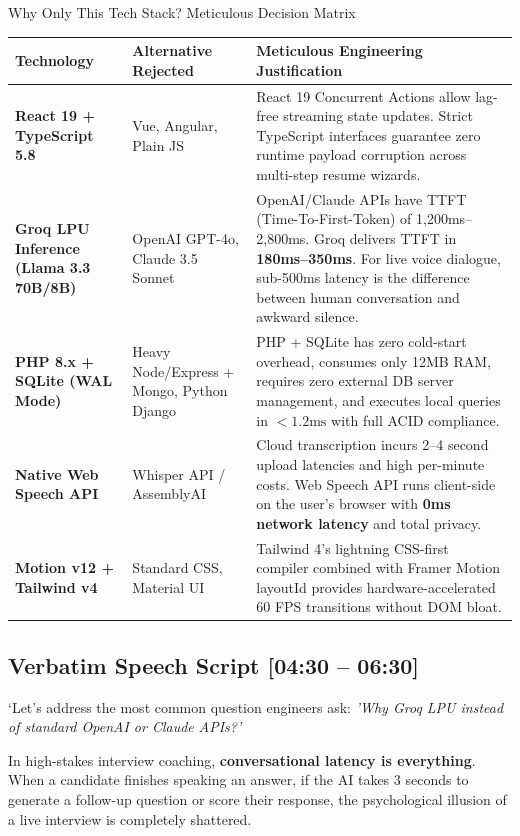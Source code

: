 \documentclass[11pt,a4paper]{article}
\begin{document}
\begin{techbox}{Why Only This Tech Stack? Meticulous Decision Matrix}
\begin{tabularx}{\textwidth}{p{3.2cm} p{4.2cm} X}
\toprule
\textbf{Technology} & \textbf{Alternative Rejected} & \textbf{Meticulous Engineering Justification} \\
\midrule
\textbf{React 19 + TypeScript 5.8} & Vue, Angular, Plain JS & React 19 Concurrent Actions allow lag-free streaming state updates. Strict TypeScript interfaces guarantee zero runtime payload corruption across multi-step resume wizards. \\
\midrule
\textbf{Groq LPU Inference (Llama 3.3 70B/8B)} & OpenAI GPT-4o, Claude 3.5 Sonnet & OpenAI/Claude APIs have TTFT (Time-To-First-Token) of 1,200ms--2,800ms. Groq delivers TTFT in \textbf{180ms--350ms}. For live voice dialogue, sub-500ms latency is the difference between human conversation and awkward silence. \\
\midrule
\textbf{PHP 8.x + SQLite (WAL Mode)} & Heavy Node/Express + Mongo, Python Django & PHP + SQLite has zero cold-start overhead, consumes only 12MB RAM, requires zero external DB server management, and executes local queries in $<1.2\text{ms}$ with full ACID compliance. \\
\midrule
\textbf{Native Web Speech API} & Whisper API / AssemblyAI & Cloud transcription incurs 2--4 second upload latencies and high per-minute costs. Web Speech API runs client-side on the user's browser with \textbf{0ms network latency} and total privacy. \\
\midrule
\textbf{Motion v12 + Tailwind v4} & Standard CSS, Material UI & Tailwind 4's lightning CSS-first compiler combined with Framer Motion layoutId provides hardware-accelerated 60 FPS transitions without DOM bloat. \\
\bottomrule
\end{tabularx}
\end{techbox}

\subsection{Verbatim Speech Script [04:30 -- 06:30]}
`Let's address the most common question engineers ask: \textit{'Why Groq LPU instead of standard OpenAI or Claude APIs?'}

In high-stakes interview coaching, \textbf{conversational latency is everything}. When a candidate finishes speaking an answer, if the AI takes 3 seconds to generate a follow-up question or score their response, the psychological illusion of a live interview is completely shattered. 
\end{document}
